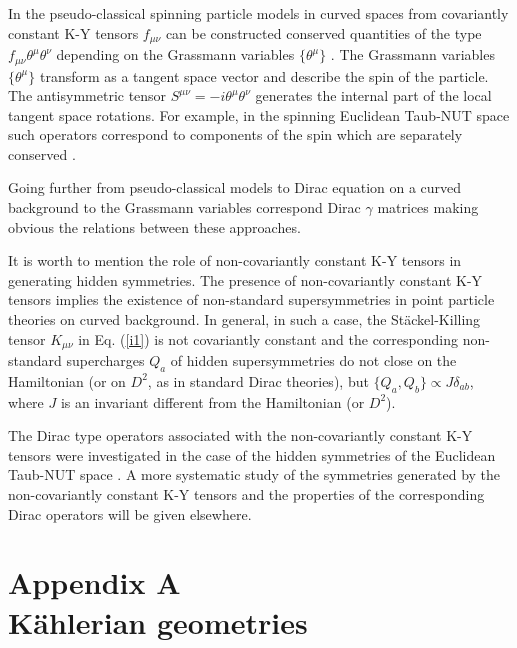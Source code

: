 \documentclass[a4paper,12pt]{article}
\begin{document}
In the pseudo-classical spinning particle models in curved spaces from 
covariantly constant K-Y tensors $f_{\mu\nu}$ can be constructed 
conserved quantities of the type $f_{\mu\nu} \theta^\mu \theta^\nu$ 
depending on the Grassmann variables $\{\theta^\mu\}$ \cite{VV}. 
The Grassmann variables $\{\theta^\mu\}$ transform as a tangent space 
vector and describe the spin of the particle. The antisymmetric tensor 
$S^{\mu\nu} = - i \theta^\mu \theta^\nu$ generates the internal part of the 
local tangent space rotations. For example, in the spinning Euclidean 
Taub-NUT space such operators correspond to components of the spin which 
are separately conserved \cite{JWH}.

Going further from pseudo-classical models to Dirac equation on a curved 
background to the Grassmann variables  correspond Dirac $\gamma$ 
matrices making obvious the relations between these approaches.  

It is worth to mention the role of non-covariantly constant K-Y tensors 
in generating hidden symmetries. The presence of non-covariantly 
constant K-Y tensors implies the existence of non-standard 
supersymmetries in point particle theories on curved background. In 
general, in such a case, the St\" ackel-Killing tensor $K_{\mu\nu}$ in 
Eq. (\ref{i1}) is not covariantly constant and the corresponding 
non-standard supercharges $Q_a$ of hidden supersymmetries do not close 
on the Hamiltonian \cite{VV} (or on $D^2$, as in standard Dirac theories),
but $\{ Q_a , Q_b \} \propto J \delta_{ab}$, where $J$ is an invariant
different from the Hamiltonian (or $D^2$).

The Dirac type operators associated with the non-covariantly constant 
K-Y tensors were investigated in the case of the hidden symmetries of 
the Euclidean Taub-NUT space \cite{CV}. 
A more systematic study of the symmetries generated by the 
non-co\-va\-ri\-ant\-ly constant K-Y tensors and the properties of the 
corresponding Dirac operators will be given elsewhere.


\setcounter{equation}{0} \renewcommand{\theequation}
{A.\arabic{equation}}

\section*{Appendix A\\K\" ahlerian geometries}
\end{document}
